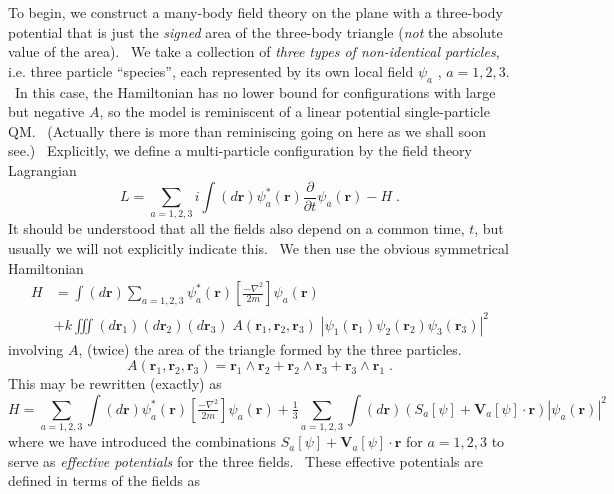 \documentclass[a4paper,12pt]{article}%
\begin{document}
To begin, we construct a many-body field theory on the plane with a three-body
potential that is just the \emph{signed} area of the three-body triangle
(\emph{not} the absolute value of the area). \ We take a collection of
\emph{three types of non-identical particles}, i.e. three particle
``species'', each represented by its own local field $\psi_{a}$ , $a=1,2,3$.
\ In this case, the Hamiltonian has no lower bound for configurations with
large but negative $A$, so the model is reminiscent of a linear potential
single-particle QM. \ (Actually there is more than reminiscing going on here
as we shall soon see.) \ Explicitly, we define a multi-particle configuration
by the field theory Lagrangian%
\[
L=\sum_{a=1,2,3}i\int\left(  d\mathbf{r}\right)  \psi_{a}^{\ast}\left(
\mathbf{r}\right)  \frac{\partial}{\partial t}\psi_{a}\left(  \mathbf{r}%
\right)  -H\;.
\]
It should be understood that all the fields also depend on a common time, $t$,
but usually we will not explicitly indicate this. \ We then use the obvious
symmetrical Hamiltonian%
\begin{align*}
H  &  =%
{\textstyle\int}
\left(  d\mathbf{r}\right)  \sum_{a=1,2,3}\psi_{a}^{\ast}\left(
\mathbf{r}\right)  \left[  \tfrac{-\nabla^{2}}{2m}\right]  \psi_{a}\left(
\mathbf{r}\right) \\
&  +k%
{\textstyle\iiint}
\left(  d\mathbf{r}_{1}\right)  \left(  d\mathbf{r}_{2}\right)  \left(
d\mathbf{r}_{3}\right)  \;A\left(  \mathbf{r}_{1},\mathbf{r}_{2}%
,\mathbf{r}_{3}\right)  \;\left|  \psi_{1}\left(  \mathbf{r}_{1}\right)
\psi_{2}\left(  \mathbf{r}_{2}\right)  \psi_{3}\left(  \mathbf{r}_{3}\right)
\right|  ^{2}%
\end{align*}
involving $A$, (twice) the area of the triangle formed by the three particles.%
\[
A\left(  \mathbf{r}_{1},\mathbf{r}_{2},\mathbf{r}_{3}\right)  =\mathbf{r}%
_{1}\wedge\mathbf{r}_{2}+\mathbf{r}_{2}\wedge\mathbf{r}_{3}+\mathbf{r}%
_{3}\wedge\mathbf{r}_{1}\;.
\]
This may be rewritten (exactly) as%
\[
H=\sum_{a=1,2,3}%
{\textstyle\int}
\left(  d\mathbf{r}\right)  \psi_{a}^{\ast}\left(  \mathbf{r}\right)  \left[
\tfrac{-\nabla^{2}}{2m}\right]  \psi_{a}\left(  \mathbf{r}\right)  +\tfrac
{1}{3}\sum_{a=1,2,3}%
{\textstyle\int}
\left(  d\mathbf{r}\right)  \left(  S_{a}\left[  \psi\right]  +\mathbf{V}%
_{a}\left[  \psi\right]  \cdot\mathbf{r}\right)  \left|  \psi_{a}\left(
\mathbf{r}\right)  \right|  ^{2}%
\]
where we have introduced the combinations $S_{a}\left[  \psi\right]
+\mathbf{V}_{a}\left[  \psi\right]  \cdot\mathbf{r}$ for $a=1,2,3$ to serve as
\emph{effective potentials} for the three fields. \ These effective potentials
are defined in terms of the fields as%
\end{document}
